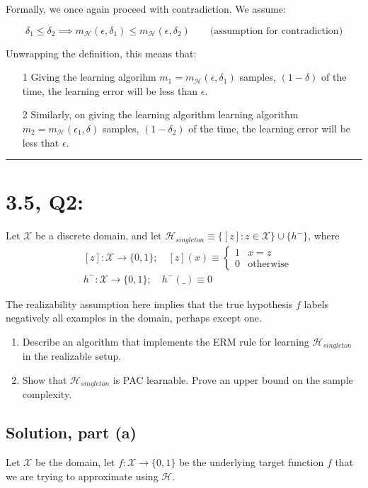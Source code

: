 \documentclass[11pt]{article}
\renewcommand{\H}{\ensuremath{\mathcal{H}}}
\newcommand{\X}{\ensuremath{\mathcal{X}}}
\begin{document}
Formally, we once again proceed with contradiction. We assume:

$$
\delta_1 \leq \delta_2 \implies m_\H(\epsilon, \delta_1) \leq m_\H(\epsilon, \delta_2) \qquad 
\text{(assumption for contradiction)}
$$

Unwrapping the definition, this means that:
\begin{itemize}
    \item[1] Giving the learning algorihm $m_1 = m_\H(\epsilon, \delta_1)$
        samples,  $(1 - \delta)$ of the time, the learning error will be
        less than $\epsilon$.

    \item[2] Similarly, on giving the learning algorithm learning algorithm
        $m_2 = m_\H(\epsilon_1, \delta)$ samples, $(1 - \delta_2)$ of the
        time, the learning error will be less that $\epsilon$.
\end{itemize}


\rule{\textwidth}{1pt}
\section*{3.5, Q2:} 
Let $\X$ be a discrete domain, and let 
$\H_{singleton} \equiv \{ [z] : z \in \X \} \cup \{h^− \}$, where
\begin{align*}
&[z]: \X \rightarrow \{0,1\};  \quad [z](x) \equiv \begin{cases} 1 & x = z \\ 0 & \text{otherwise} \end{cases}\\
&h^−: \X \rightarrow \{0, 1\}; \quad h^-(\_) \equiv 0
\end{align*}

The realizability assumption here implies that the true hypothesis $f$ labels
negatively all examples in the domain, perhaps except one.

\begin{enumerate}
    \item Describe an algorithm that implements the ERM rule for learning
        $\H_{singleton}$ in the realizable setup.
    \item Show that $\H_{singleton}$ is PAC learnable. Prove an upper
        bound on the sample complexity.
\end{enumerate}

\subsection*{Solution, part (a)}
Let $\X$ be the domain, let $f: \X \rightarrow \{0, 1\}$ be the underlying
target function $f$ that we are trying to approximate using $\H$.
\end{document}
